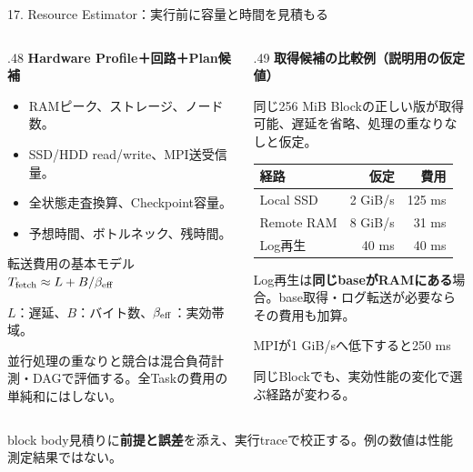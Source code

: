 \documentclass[aspectratio=169,10pt,hyperref={unicode,hidelinks}]{beamer}
\newcommand{\takeaway}[1]{\par\vspace{2mm}\begin{beamercolorbox}[wd=\textwidth,sep=1.5mm]{block body}\small #1\end{beamercolorbox}\par}
\newcommand{\smallnote}[1]{\par{\footnotesize\color{muted}#1\par}}
\begin{document}
\begin{frame}{17. Resource Estimator：実行前に容量と時間を見積もる}
  \begin{columns}[T,onlytextwidth]
    \begin{column}{.48\textwidth}
      \textbf{Hardware Profile＋回路＋Plan候補}
      \begin{itemize}
        \item RAMピーク、ストレージ、ノード数。
        \item SSD/HDD read/write、MPI送受信量。
        \item 全状態走査換算、Checkpoint容量。
        \item 予想時間、ボトルネック、残時間。
      \end{itemize}
      \begin{block}{転送費用の基本モデル}
        \small $T_{\rm fetch}\approx L+B/\beta_{\rm eff}$\par
        $L$：遅延、$B$：バイト数、$\beta_{\rm eff}$：実効帯域。
      \end{block}
      \smallnote{並行処理の重なりと競合は混合負荷計測・DAGで評価する。全Taskの費用の単純和にはしない。}
    \end{column}
    \begin{column}{.49\textwidth}
      \textbf{取得候補の比較例（説明用の仮定値）}\par
      \small 同じ256 MiB Blockの正しい版が取得可能、遅延を省略、処理の重なりなしと仮定。\par
      \medskip
      \begin{tabularx}{\linewidth}{@{}Xrr@{}}
        \toprule 経路 & 仮定 & 費用 \\
        \midrule
        Local SSD & 2 GiB/s & 125 ms \\
        Remote RAM & 8 GiB/s & 31 ms \\
        Log再生 & 40 ms & 40 ms \\
        \bottomrule
      \end{tabularx}
      \medskip
      \small Log再生は\textbf{同じbaseがRAMにある}場合。base取得・ログ転送が必要ならその費用も加算。\par
      \medskip
      \alert{MPIが1 GiB/sへ低下すると250 ms}\par
      \small 同じBlockでも、実効性能の変化で選ぶ経路が変わる。
    \end{column}
  \end{columns}
  \takeaway{見積りに\textbf{前提と誤差}を添え、実行traceで校正する。例の数値は性能測定結果ではない。}
\end{frame}
\end{document}
